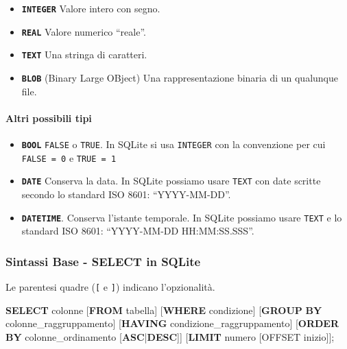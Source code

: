 \documentclass[italian,a4paper]{article}
\newenvironment{Shaded}{}{}
\newcommand{\KeywordTok}[1]{\textcolor[rgb]{0.00,0.44,0.13}{\textbf{#1}}}
\newcommand{\NormalTok}[1]{#1}
\providecommand{\tightlist}{%
  \setlength{\itemsep}{0pt}\setlength{\parskip}{0pt}}
\begin{document}
\begin{itemize}
\item
  \textbf{\texttt{INTEGER}} Valore intero con segno.
\item
  \textbf{\texttt{REAL}} Valore numerico ``reale''.
\item
  \textbf{\texttt{TEXT}} Una stringa di caratteri.
\item
  \textbf{\texttt{BLOB}} (Binary Large OBject) Una rappresentazione
  binaria di un qualunque file.
\end{itemize}

\paragraph{Altri possibili tipi}\label{altri-possibili-tipi}

\begin{itemize}
\tightlist
\item
  \textbf{\texttt{BOOL}} \texttt{FALSE} o \texttt{TRUE}. In SQLite si
  usa \texttt{INTEGER} con la convenzione per cui \texttt{FALSE\ =\ 0} e
  \texttt{TRUE\ =\ 1}
\item
  \textbf{\texttt{DATE}} Conserva la data. In SQLite possiamo usare
  \texttt{TEXT} con date scritte secondo lo standard ISO 8601:
  ``YYYY-MM-DD''.
\item
  \textbf{\texttt{DATETIME}}. Conserva l'istante temporale. In SQLite
  possiamo usare \texttt{TEXT} e lo standard ISO 8601: ``YYYY-MM-DD
  HH:MM:SS.SSS''.
\end{itemize}

\subsubsection{Sintassi Base - SELECT in
SQLite}\label{sintassi-base---select-in-sqlite}

Le parentesi quadre (\texttt{{[}} e \texttt{{]}}) indicano
l'opzionalità.

\begin{Shaded}
\begin{Highlighting}[]
\KeywordTok{SELECT}\NormalTok{ colonne}
\NormalTok{[}\KeywordTok{FROM}\NormalTok{ tabella]}
\NormalTok{[}\KeywordTok{WHERE}\NormalTok{ condizione]}
\NormalTok{[}\KeywordTok{GROUP} \KeywordTok{BY}\NormalTok{ colonne\_raggruppamento]}
\NormalTok{[}\KeywordTok{HAVING}\NormalTok{ condizione\_raggruppamento]}
\NormalTok{[}\KeywordTok{ORDER} \KeywordTok{BY}\NormalTok{ colonne\_ordinamento [}\KeywordTok{ASC}\NormalTok{|}\KeywordTok{DESC}\NormalTok{]]}
\NormalTok{[}\KeywordTok{LIMIT}\NormalTok{ numero [OFFSET inizio]];}
\end{Highlighting}
\end{Shaded}
\end{document}
